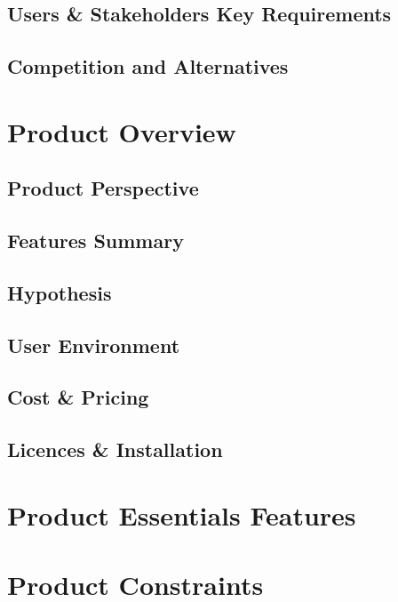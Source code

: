 \documentclass[12pt,a4paper,oneside, titlepage]{article}
\begin{document}
	\subsection{Users \& Stakeholders Key Requirements}
	\subsection{Competition and Alternatives}
	
    \newpage
	\section{Product Overview}
	\subsection{Product Perspective}
	\subsection{Features Summary}
	\subsection{Hypothesis}
	\subsection{User Environment}
	\subsection{Cost \& Pricing}
	\subsection{Licences \& Installation}
	
    \newpage
	\section{Product Essentials Features}

    \newpage
	\section{Product Constraints}
	
\end{document}
